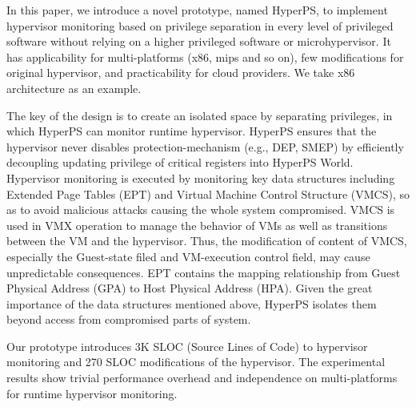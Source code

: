 ﻿\documentclass[conference]{IEEEtran}
\begin{document}
In this paper, we introduce a novel prototype, named HyperPS, to implement hypervisor monitoring based on privilege separation in every level of privileged software without relying on a higher privileged software or microhypervisor. It has applicability for multi-platforms (x86, mips and so on), few modifications for original hypervisor, and practicability for cloud providers.
We take x86 architecture as an example.

The key of the design is to create an isolated space by separating privileges, in which HyperPS can monitor runtime hypervisor. 
HyperPS ensures that the hypervisor never disables protection-mechanism (e.g., DEP, SMEP) by efficiently decoupling updating privilege of critical registers into HyperPS World.
Hypervisor monitoring is executed by monitoring key data structures including Extended Page Tables (EPT) and Virtual Machine Control Structure (VMCS),
so as to avoid malicious attacks causing the whole system compromised. VMCS is used in VMX operation to manage the behavior of VMs as well as transitions between the VM and the hypervisor. Thus, the modification of content of VMCS, especially the Guest-state filed and VM-execution control field, may cause unpredictable consequences. EPT contains the mapping relationship from Guest Physical Address (GPA) to Host Physical Address (HPA). Given the great importance of the data structures mentioned above, HyperPS isolates them beyond access from compromised parts of system.



Our prototype introduces 3K SLOC (Source Lines of Code) to hypervisor monitoring and 270 SLOC modifications of the hypervisor.
The experimental results show trivial performance overhead and independence on multi-platforms for runtime hypervisor monitoring. 
\end{document}
